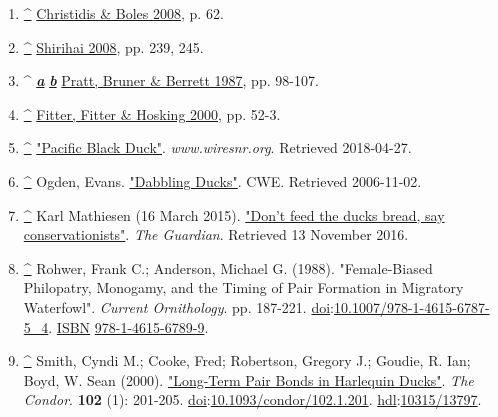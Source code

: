 \documentclass[11pt,a4paper]{article}
\begin{document}
\begin{enumerate}
\item \href{\#cite\_ref-FOOTNOTEChristidisBoles200862\_19-0}{\textbf{\textasciicircum{}}} \href{\#CITEREFChristidisBoles2008}{Christidis \& Boles 2008}, p. 62.
\item \href{\#cite\_ref-FOOTNOTEShirihai2008239,\_245\_20-0}{\textbf{\textasciicircum{}}} \href{\#CITEREFShirihai2008}{Shirihai 2008}, pp. 239, 245.
\item \textasciicircum{} \href{\#cite\_ref-FOOTNOTEPrattBrunerBerrett198798–107\_21-0}{\textit{\textbf{a}}} \href{\#cite\_ref-FOOTNOTEPrattBrunerBerrett198798–107\_21-1}{\textit{\textbf{b}}} \href{\#CITEREFPrattBrunerBerrett1987}{Pratt, Bruner \& Berrett 1987}, pp. 98-107.
\item \href{\#cite\_ref-FOOTNOTEFitterFitterHosking200052–3\_22-0}{\textbf{\textasciicircum{}}} \href{\#CITEREFFitterFitterHosking2000}{Fitter, Fitter \& Hosking 2000}, pp. 52-3.
\item \href{\#cite\_ref-23}{\textbf{\textasciicircum{}}} \href{http://www.wiresnr.org/pacificblackduck.html}{"Pacific Black Duck"}. \textit{www.wiresnr.org}. Retrieved 2018-04-27.
\item \href{\#cite\_ref-24}{\textbf{\textasciicircum{}}} Ogden, Evans. \href{https://www.sfu.ca/biology/wildberg/species/dabbducks.html}{"Dabbling Ducks"}. CWE. Retrieved 2006-11-02.
\item \href{\#cite\_ref-25}{\textbf{\textasciicircum{}}} Karl Mathiesen (16 March 2015). \href{https://www.theguardian.com/environment/2015/mar/16/dont-feed-the-ducks-bread-say-conservationists}{"Don't feed the ducks bread, say conservationists"}. \textit{The Guardian}. Retrieved 13 November 2016.
\item \href{\#cite\_ref-26}{\textbf{\textasciicircum{}}} Rohwer, Frank C.; Anderson, Michael G. (1988). "Female-Biased Philopatry, Monogamy, and the Timing of Pair Formation in Migratory Waterfowl". \textit{Current Ornithology}. pp. 187-221. \href{/wiki/Doi\_\%28identifier\%29}{doi}:\href{https://doi.org/10.1007\%2F978-1-4615-6787-5\_4}{10.1007/978-1-4615-6787-5\_4}. \href{/wiki/ISBN\_\%28identifier\%29}{ISBN} \href{/wiki/Special:BookSources/978-1-4615-6789-9}{978-1-4615-6789-9}.
\item \href{\#cite\_ref-27}{\textbf{\textasciicircum{}}} Smith, Cyndi M.; Cooke, Fred; Robertson, Gregory J.; Goudie, R. Ian; Boyd, W. Sean (2000). \href{https://doi.org/10.1093\%2Fcondor\%2F102.1.201}{"Long-Term Pair Bonds in Harlequin Ducks"}. \textit{The Condor}. \textbf{102} (1): 201-205. \href{/wiki/Doi\_\%28identifier\%29}{doi}:\href{https://doi.org/10.1093\%2Fcondor\%2F102.1.201}{10.1093/condor/102.1.201}. \href{/wiki/Hdl\_\%28identifier\%29}{hdl}:\href{https://hdl.handle.net/10315\%2F13797}{10315/13797}.

\end{enumerate}
\end{document}
